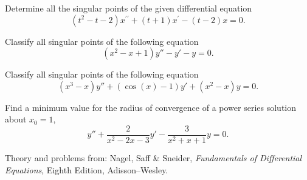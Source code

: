 \documentclass[11pt]{article}
\begin{document}
\makelabtitle



\begin{problem}
{ Determine all the singular points of the given differential equation}
\begin{equation*}
(t^2-t-2)x^{\prime \prime} + (t+1)x^{\prime} - (t-2)x =0.
\end{equation*}
\end{problem}

\begin{problem}
Classify all singular points of the following equation
\begin{equation*}
(x^{2}-x+1)y'' -y' - y = 0.
\end{equation*}
\end{problem}

\begin{problem}
Classify all singular points of the following equation
\begin{equation*}
(x^{3}-x)y'' + (\cos (x) - 1)y' + (x^2 -x)y = 0.
\end{equation*}
\end{problem}



\begin{problem}
Find a minimum value for the radius of convergence of a power series solution about $x_{0} =1$,
\begin{equation*}
y'' + \frac{2}{x^{2}-2x-3}y'-\frac{3}{x^2+x+1}y =0.
\end{equation*}
\end{problem}


% 






\LabSolutions


Theory and problems from: Nagel, Saff \& Sneider, \textit{Fundamentals of Differential Equations}, Eighth Edition, Adisson--Wesley.
\end{document}
